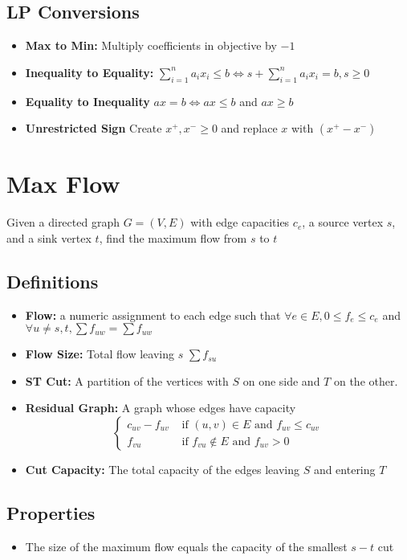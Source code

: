 \documentclass{article}
\begin{document}
\subsection*{LP Conversions}
\begin{itemize}
    \item \textbf{Max to Min:} Multiply coefficients in objective by $-1$
    \item \textbf{Inequality to Equality:} $\sum_{i=1}^na_ix_i\leq b \Leftrightarrow s + \sum_{i=1}^na_ix_i =  b, s \geq 0$
    \item \textbf{Equality to Inequality} $ax = b \Leftrightarrow ax \leq b$ and $ax \geq b$
    \item \textbf{Unrestricted Sign} Create $x^+, x^- \geq 0$ and replace $x$ with $(x^+-x^-)$
\end{itemize}
\noindent\makebox[\linewidth]{\rule{\textwidth}{0.4pt}}
\section*{Max Flow}
Given a directed graph $G=(V, E)$ with edge capacities $c_e$, a source vertex $s$, and a sink vertex $t$, find the maximum flow from $s$ to $t$
\subsection*{Definitions}
\begin{itemize}
    \item \textbf{Flow: } a numeric assignment to each edge such that $\forall e\in E, 0 \leq f_e \leq c_e$ and $\forall u\ne s, t, \sum f_{uw}=\sum f_{uw}$
    \item \textbf{Flow Size: } Total flow leaving $s$ $\sum f_{su}$
    \item \textbf{ST Cut: } A partition of the vertices with $S$ on one side and $T$ on the other.
    \item \textbf{Residual Graph: } A graph whose edges have capacity \[\begin{cases}c_{uv}-f_{uv} & \text{ if } (u,v)\in E \text{ and } f_{uv} \leq c_{uv}\\
        f_{vu} & \text{ if } f_{vu} \notin E \text{ and } f_{uv} > 0
    \end{cases}\]
    \item \textbf{Cut Capacity:} The total capacity of the edges leaving $S$ and entering $T$
\end{itemize}
\subsection*{Properties}
\begin{itemize}
    \item The size of the maximum flow equals the capacity of the smallest $s-t$ cut
\end{itemize}
\noindent\makebox[\linewidth]{\rule{\textwidth}{0.4pt}}
\end{document}
